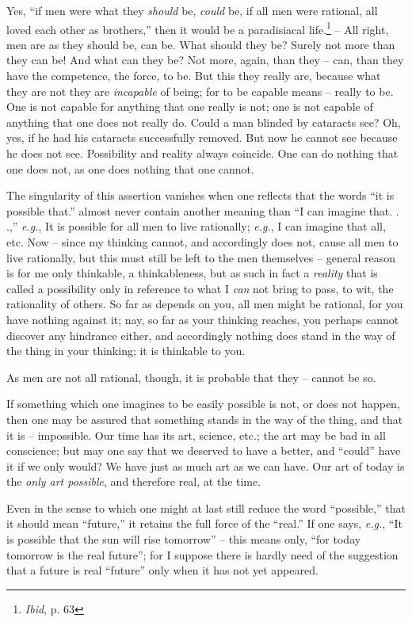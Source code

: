 Yes, ``if men were what they \textit{should} be, \textit{could} be, if all 
men were rational, all loved each other as brothers,'' then it would be a 
paradisiacal life.\footnote{\textit{Ibid}, p. 63} -- All right, men are as 
they should be, can be. What should they be? Surely not more than they can be! 
And what can they be? Not more, again, than they -- can, than they have the 
competence, the force, to be. But this they really are, because what they are 
not they are \textit{incapable} of being; for to be capable means -- really to 
be. One is not capable for anything that one really is not; one is not capable 
of anything that one does not really do. Could a man blinded by cataracts see? 
Oh, yes, if he had his cataracts successfully removed. But now he cannot see 
because he does not see. Possibility and reality always coincide. One can do 
nothing that one does not, as one does nothing that one cannot.

The singularity of this assertion vanishes when one reflects that the words 
``it is possible that.'' almost never contain another meaning than ``I can 
imagine that. . .,'' \textit{e.g.}, It is possible for all men to live 
rationally; \textit{e.g.}, I can imagine that all, etc. Now -- since my 
thinking cannot, and accordingly does not, cause all men to live rationally, 
but this must still be left to the men themselves -- general reason is for me 
only thinkable, a thinkableness, but as such in fact a \textit{reality} that 
is called a possibility only in reference to what I \textit{can} not bring to 
pass, to wit, the rationality of others. So far as depends on you, all men 
might be rational, for you have nothing against it; nay, so far as your 
thinking reaches, you perhaps cannot discover any hindrance either, and 
accordingly nothing does stand in the way of the thing in your thinking; it is 
thinkable to you.

As men are not all rational, though, it is probable that they -- cannot be so.

If something which one imagines to be easily possible is not, or does not 
happen, then one may be assured that something stands in the way of the thing, 
and that it is -- impossible. Our time has its art, science, etc.; the art may 
be bad in all conscience; but may one say that we deserved to have a better, 
and ``could'' have it if we only would? We have just as much art as we can 
have. Our art of today is the \textit{only art possible}, and therefore real, 
at the time.

Even in the sense to which one might at last still reduce the word 
``possible,'' that it should mean ``future,'' it retains the full force of 
the ``real.'' If one says, \textit{e.g.}, ``It is possible that the sun 
will rise tomorrow'' -- this means only, ``for today tomorrow is the real 
future''; for I suppose there is hardly need of the suggestion that a future 
is real ``future'' only when it has not yet appeared.

